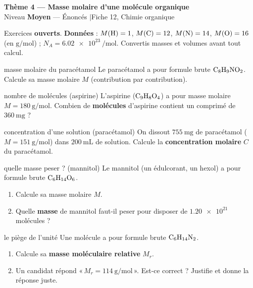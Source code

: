 \documentclass[11pt,a4paper]{article}
\newcommand{\banner}[2]{%
\begin{tcolorbox}[enhanced,colback=primary,colframe=primary,arc=5pt,boxrule=0pt,
   left=5mm,right=5mm,top=2.5mm,bottom=2.5mm,coltext=white]
{\large\bfseries #1}\\[1pt]{\small #2}
\end{tcolorbox}\vspace{2pt}}
\begin{document}
\banner{Thème 4 — Masse molaire d'une molécule organique}{Niveau \textbf{Moyen} — Énoncés \quad$\vert$\quad Fiche 12, Chimie organique}

\begin{consigne}
Exercices \textbf{ouverts}. \textbf{Données} : $M(\ce{H})=1$, $M(\ce{C})=12$, $M(\ce{N})=14$, $M(\ce{O})=16$ (en $\si{\g\per\mol}$) ; $N_A = \qty{6,02e23}{\per\mol}$. Convertis masses et volumes avant tout calcul.
\end{consigne}

\begin{exo}{masse molaire du paracétamol}
Le paracétamol a pour formule brute $\ce{C8H9NO2}$. Calcule sa masse molaire $M$ (contribution par contribution).
\end{exo}

\begin{exo}{nombre de molécules (aspirine)}
L'aspirine ($\ce{C9H8O4}$) a pour masse molaire $M=\qty{180}{\g\per\mol}$. Combien de \textbf{molécules} d'aspirine contient un comprimé de $\qty{360}{\mg}$ ?
\end{exo}

\begin{exo}{concentration d'une solution (paracétamol)}
On dissout $\qty{755}{\mg}$ de paracétamol ($M=\qty{151}{\g\per\mol}$) dans $\qty{200}{\mL}$ de solution. Calcule la \textbf{concentration molaire} $C$ du paracétamol.
\end{exo}

\begin{exo}{quelle masse peser ? (mannitol)}
Le mannitol (un édulcorant, un hexol) a pour formule brute $\ce{C6H14O6}$.
\begin{enumerate}[label=\textbf{\alph*)},leftmargin=2em,itemsep=1pt]
  \item Calcule sa masse molaire $M$.
  \item Quelle \textbf{masse} de mannitol faut-il peser pour disposer de $\qty{1,20e21}{}$ molécules ?
\end{enumerate}
\end{exo}

\begin{exo}{le piège de l'unité}
Une molécule a pour formule brute $\ce{C6H14N2}$.
\begin{enumerate}[label=\textbf{\alph*)},leftmargin=2em,itemsep=1pt]
  \item Calcule sa \textbf{masse moléculaire relative} $M_r$.
  \item Un candidat répond «\,$M_r = \qty{114}{\g\per\mol}$\,». Est-ce correct ? Justifie et donne la réponse juste.
\end{enumerate}
\end{exo}
\end{document}
